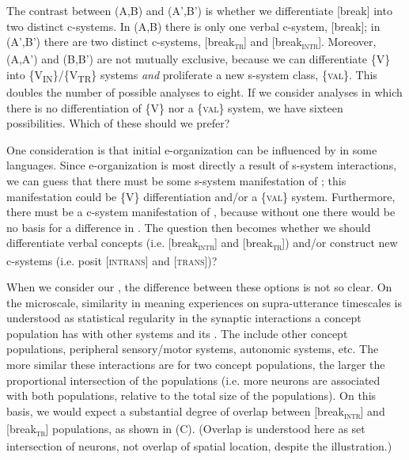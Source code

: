   The contrast between (A,B) and (A',B') is whether we differentiate [break] into two distinct c-systems. In (A,B) there is only one verbal c-system, [break]; in (A',B') there are two distinct c-systems, [break\textsc{\textsubscript{tr}}] and [break\textsc{\textsubscript{intr}}]. Moreover, (A,A') and (B,B') are not mutually exclusive, because we can differentiate \{V\} into \{V\textsubscript{IN}\}/\{V\textsubscript{TR}\} systems \textit{and} proliferate a new s-system class, \{\textsc{val}\}. This doubles the number of possible analyses to eight. If we consider analyses in which there is no differentiation of \{V\} nor a \{\textsc{val}\} system, we have sixteen possibilities. Which of these should we prefer? 

  One consideration is that initial e-organization can be influenced by  in some languages. Since e-organization is most directly a result of s-system interactions, we can guess that there must be some s-system manifestation of ; this manifestation could be \{V\} differentiation and/or a \{\textsc{val}\} system. Furthermore, there must be a c-system manifestation of , because without one there would be no basis for a difference in . The question then becomes whether we should differentiate verbal concepts (i.e. [break\textsc{\textsubscript{intr}}] and [break\textsc{\textsubscript{tr}}]) and/or construct new c-systems (i.e. posit [\textsc{intrans}] and [\textsc{trans}])?

  When we consider our , the difference between these options is not so clear. On the microscale, similarity in meaning experiences on supra-utterance timescales is understood as statistical regularity in the synaptic interactions a concept population has with other systems and its . The  include other concept populations, peripheral sensory/motor systems, autonomic systems, etc. The more similar these interactions are for two concept populations, the larger the proportional intersection of the populations (i.e. more neurons are associated with both populations, relative to the total size of the populations). On this basis, we would expect a substantial degree of overlap between [break\textsc{\textsubscript{intr}}] and [break\textsc{\textsubscript{tr}}] populations, as shown in {}(C). (Overlap is understood here as set intersection of neurons, not overlap of spatial location, despite the illustration.)

